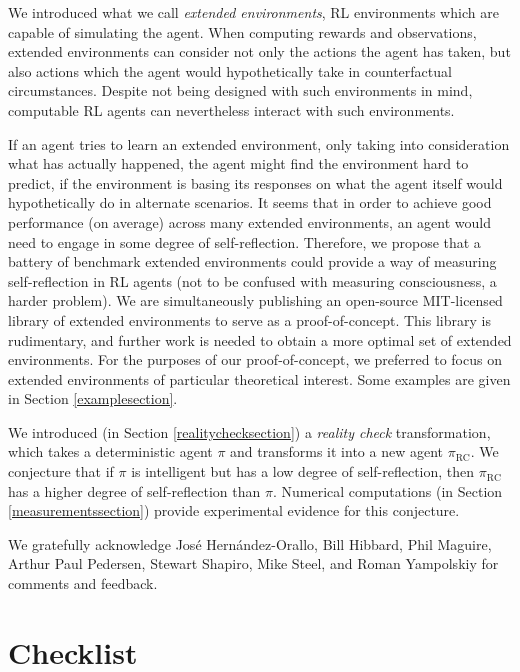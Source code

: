 \documentclass{article}
\def\RC{\textrm{RC}}
\begin{document}
We introduced what we call \emph{extended environments}, RL environments
which are capable of simulating the agent. When computing rewards and observations,
extended environments can consider not only the actions the agent has taken, but also
actions which the agent would hypothetically take in counterfactual circumstances.
Despite not being designed with such environments in mind, computable RL agents
can nevertheless interact with such environments.

If an agent tries to learn an extended environment, only taking into consideration
what has actually happened, the agent might find the environment hard to predict, if the
environment is basing its responses on what the agent itself would hypothetically
do in alternate scenarios. It seems that in order to achieve good performance (on
average) across many extended environments, an agent would need to engage in some degree of
self-reflection. Therefore, we propose that a battery of benchmark extended environments
could provide a way of measuring self-reflection in RL agents (not to be confused
with measuring consciousness, a harder problem). We are simultaneously publishing
an open-source MIT-licensed library \cite{library} of extended environments to serve
as a proof-of-concept. This library is rudimentary, and further work is
needed to obtain a more optimal set of extended environments. For the purposes of our
proof-of-concept, we preferred to focus on extended environments of particular
theoretical interest. Some examples are given in Section \ref{examplesection}.

We introduced (in Section \ref{realitychecksection}) a \emph{reality check}
transformation, which takes a deterministic agent $\pi$ and transforms it
into a new agent $\pi_{\RC}$. We conjecture that if $\pi$ is intelligent but has a low
degree of self-reflection, then $\pi_{\RC}$ has a higher degree of self-reflection
than $\pi$. Numerical computations (in Section \ref{measurementssection}) provide
experimental evidence for this conjecture.


\begin{ack}
  We gratefully acknowledge Jos{\'e} Hern{\'a}ndez-Orallo, Bill Hibbard, Phil Maguire,
  Arthur Paul Pedersen,
  Stewart Shapiro, Mike Steel, and Roman Yampolskiy for comments and feedback.
\end{ack}





\section*{Checklist}
\end{document}
